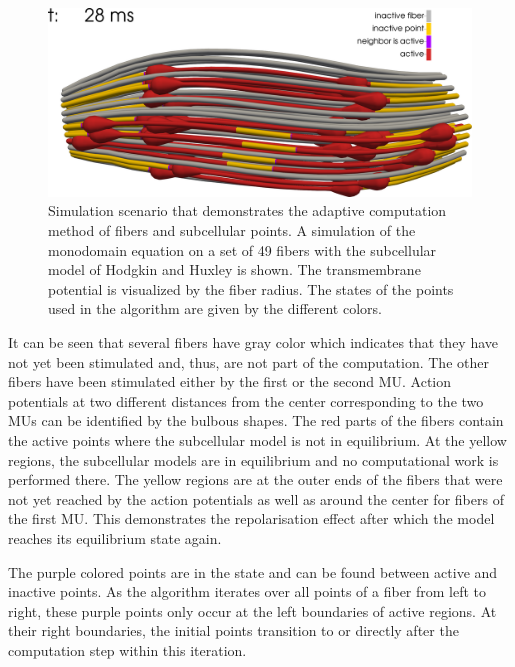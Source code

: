 \begin{figure}%
  \centering%
  \includegraphics[width=\textwidth]{images/implementation/compute_state3.png}%
  \caption{Simulation scenario that demonstrates the adaptive computation method of fibers and subcellular points. A simulation of the monodomain equation on a set of 49 fibers with the subcellular model of Hodgkin and Huxley is shown. The transmembrane potential is visualized by the fiber radius. The states of the points used in the algorithm are given by the different colors.}%
  \label{fig:compute_state3}%
\end{figure}%

It can be seen that several fibers have gray color which indicates that they have not yet been stimulated and, thus, are not part of the computation. The other fibers have been stimulated either by the first or the second MU. Action potentials at two different distances from the center corresponding to the two MUs can be identified by the bulbous shapes. The red parts of the fibers contain the active points where the subcellular model is not in equilibrium. At the yellow regions, the subcellular models are in equilibrium and no computational work is performed there. The yellow regions are at the outer ends of the fibers that were not yet reached by the action potentials as well as around the center for fibers of the first MU. This demonstrates the repolarisation effect after which the model reaches its equilibrium state again. 

The purple colored points are in the state  and can be found between active and inactive points. As the algorithm iterates over all points of a fiber from left to right, these purple points only occur at the left boundaries of active regions. At their right boundaries, the initial  points transition to  or  directly after the computation step within this iteration.

